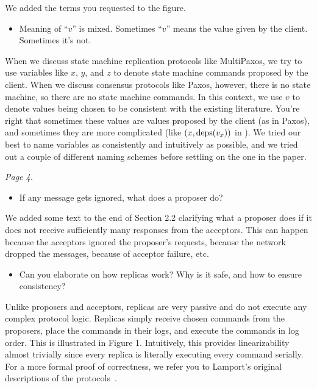 \documentclass[letterpaper,twocolumn,10pt]{article}
\newenvironment{reviewerquote}
{\list{}{\leftmargin=\parindent\rightmargin=0in}\item[] \itshape \color{ReviewerDarkGray}}%
{\endlist}
\begin{document}
We added the terms you requested to the figure.

\begin{reviewerquote}
  \begin{itemize}
    \item
      Meaning of ``$v$'' is mixed. Sometimes ``$v$'' means the value given by
      the client. Sometimes it's not.
  \end{itemize}
\end{reviewerquote}

When we discuss state machine replication protocols like MultiPaxos, we try to
use variables like $x$, $y$, and $z$ to denote state machine commands proposed
by the client. When we discuss consensus protocols like Paxos, however, there
is no state machine, so there are no state machine commands. In this context,
we use $v$ to denote values being chosen to be consistent with the existing
literature. You're right that sometimes these values are values proposed by the
client (as in Paxos), and sometimes they are more complicated (like $(x,
\text{deps}(v_x))$ in \BPaxos{}). We tried our best to name variables as consistently
and intuitively as possible, and we tried out a couple of different naming
schemes before settling on the one in the paper.

\begin{reviewerquote}
  Page 4.

  \begin{itemize}
    \item
      If any message gets ignored, what does a proposer do?
  \end{itemize}
\end{reviewerquote}

We added some text to the end of Section 2.2 clarifying what a proposer does if
it does not receive sufficiently many responses from the acceptors. This can
happen because the acceptors ignored the proposer's requests, because the
network dropped the messages, because of acceptor failure, etc.

\begin{reviewerquote}
  \begin{itemize}
    \item
      Can you elaborate on how replicas work? Why is it safe, and how to ensure
      consistency?
  \end{itemize}
\end{reviewerquote}

Unlike proposers and acceptors, replicas are very passive and do not execute
any complex protocol logic. Replicas simply receive chosen commands from the
proposers, place the commands in their logs, and execute the commands in log
order. This is illustrated in Figure 1. Intuitively, this provides
linearizability almost trivially since every replica is literally executing
every command serially. For a more formal proof of correctness, we refer you to
Lamport's original descriptions of the protocols~\cite{lamport2001paxos,
lamport1998part}.
\end{document}
